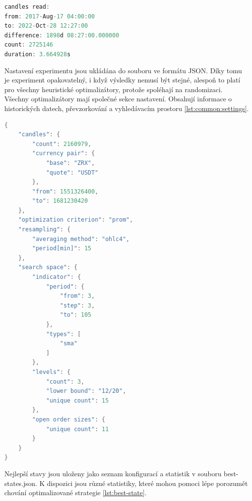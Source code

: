 \begin{lstlisting}[caption={~Informace o načtených historických svíčkách z výstupního logu},label={lst:log:candles},captionpos=t,abovecaptionskip=-\medskipamount,belowcaptionskip=\medskipamount,language=C]
candles read:
from: 2017-Aug-17 04:00:00
to: 2022-Oct-28 12:27:00
difference: 1898d 08:27:00.000000
count: 2725146
duration: 3.664928s
\end{lstlisting}

Nastavení experimentu jsou ukládána do souboru ve formátu JSON.
Díky tomu je experiment opakovatelný, i když výsledky nemusí být stejné, alespoň to platí pro všechny heuristické optimalizátory, protože spoléhají na randomizaci.
Všechny optimalizátory mají společné sekce nastavení.
Obsahují informace o historických datech, převzorkování a vyhledávacím prostoru \ref{lst:common:settings}.

\begin{lstlisting}[caption={~Společné části nastavení},label={lst:common:settings},captionpos=t,abovecaptionskip=-\medskipamount,belowcaptionskip=\medskipamount,language=C]
{
    "candles": {
        "count": 2160979,
        "currency pair": {
            "base": "ZRX",
            "quote": "USDT"
        },
        "from": 1551326400,
        "to": 1681230420
    },
    "optimization criterion": "prom",
    "resampling": {
        "averaging method": "ohlc4",
        "period[min]": 15
    },
    "search space": {
        "indicator": {
            "period": {
                "from": 3,
                "step": 3,
                "to": 105
            },
            "types": [
                "sma"
            ]
        },
        "levels": {
            "count": 3,
            "lower bound": "12/20",
            "unique count": 15
        },
        "open order sizes": {
            "unique count": 11
        }
    }
}
\end{lstlisting}

Nejlepší stavy jsou uloženy jako seznam konfigurací a statistik v souboru best-states.json.
K dispozici jsou různé statistiky, které mohou pomoci lépe porozumět chování optimalizované strategie \ref{lst:best-state}.

